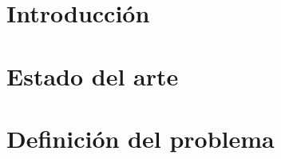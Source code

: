 \documentclass[english, a4paper, 12pt, twoside]{article}
\numberwithin{equation}{section} %
\def\biblio{\clearpage} %
\begin{document}
\def\biblio{} %


\restoregeometry %

\thispagestyle{plain} %

%     

\newpage
\tableofcontents

\newpage
{} %
\setcounter{page}{1} %
\setcounter{tocdepth}{0}

\section{Introducción} %
\clearpage %

%     

\section{Estado del arte}
    
\clearpage

\section{Definición del problema}
    
\clearpage

%    
\end{document}
